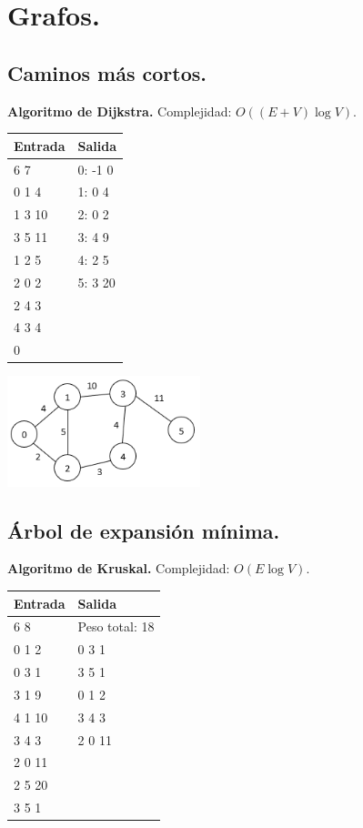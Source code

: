 \documentclass[12pt, letterpaper, twoside]{article}
\begin{document}
\section{Grafos.}

\subsection{Caminos más cortos.}

\textbf{Algoritmo de Dijkstra.} Complejidad: $O((E + V) \log V)$.



\begin{tabular}{|p{7cm}|p{7cm}|}
\hline
\textbf{Entrada} & \textbf{Salida}\\ \hline
6 7    & 0: -1 0\\
0 1 4  & 1: 0 4\\
1 3 10 & 2: 0 2\\
3 5 11 & 3: 4 9\\
1 2 5  & 4: 2 5\\
2 0 2  & 5: 3 20\\
2 4 3  & \\
4 3 4  & \\
0      & \\ \hline
\end{tabular}

\begin{center}
\includegraphics[width = 0.42\textwidth]{Grafos/Imagenes/ShortestPath.png}
\end{center}

\subsection{Árbol de expansión mínima.}

\textbf{Algoritmo de Kruskal.} Complejidad: $O(E \log V)$.



\begin{tabular}{|p{7cm}|p{7cm}|}
\hline
\textbf{Entrada} & \textbf{Salida}\\ \hline
6 8    & Peso total: 18\\
0 1 2  & 0 3 1\\
0 3 1  & 3 5 1\\
3 1 9  & 0 1 2\\
4 1 10 & 3 4 3\\
3 4 3  & 2 0 11\\
2 0 11 & \\
2 5 20 & \\
3 5 1  & \\ \hline
\end{tabular}
\end{document}

